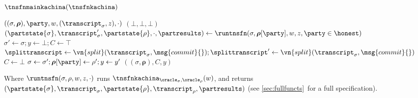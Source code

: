 \begin{transitionfnsketch}{$\tnsfnmainkachina(\tnsfnkachina)$}
  \vspace{-1em}
  \begin{receiveinput*}{$((\sigma, \boldsymbol\rho), \party, w,
      (\transcript_\sigma, z), \cdot)$}
    \If{$\transcript_\sigma(\sigma) = \bot$}
      \Return $(\bot, \bot, \bot)$
    \EndIf
    \State \Let $(\partstate{\sigma}, \transcript_\sigma', \partstate{\rho}, \cdot, \partresults) \gets
      \runtnsfn(\sigma, \boldsymbol\rho[\party], w, z, \party \in \honest)$
      \State \Let $\sigma' \gets \sigma; y \gets \bot; C \gets \top$
      \State \Let $\splittranscript \gets
        \vn{split}(\transcript_\sigma, \msg{commit}{}); \splittranscript' \gets
        \vn{split}(\transcript_\sigma, \msg{commit}{})$
        \State \Let $C \gets \bot$
        \State \Break
      \EndIf
      \State \Let $\sigma \gets \sigma'; \boldsymbol\rho[\party] \gets \rho'; y
        \gets y'$
    \EndFor
    \State \Return $((\sigma, \boldsymbol\rho), C, y)$
  \end{receiveinput*}

  \noindent Where $\runtnsfn(\sigma, \rho, w, z, \cdot)$ runs
  $\tnsfnkachina_{\oracle_\sigma, \oracle_\rho}(w)$, and returns $(\partstate{\sigma},\allowbreak
  \transcript_\sigma,\allowbreak \partstate{\rho}, \transcript_\rho, \partresults)$ (see
  \iffull\autoref{sec:fullfuncts}\else\cite[Appendix~C]{fullversion}\fi\ for a full specification).
\end{transitionfnsketch}

